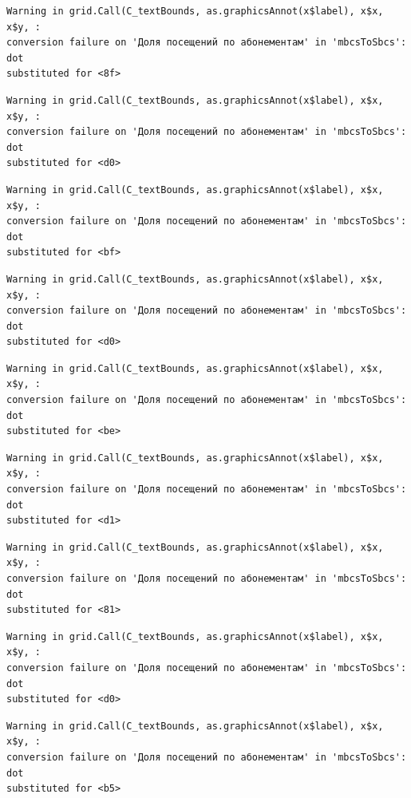 \documentclass[
  letterpaper,
  DIV=11,
  numbers=noendperiod]{scrartcl}
\begin{document}
\begin{verbatim}
Warning in grid.Call(C_textBounds, as.graphicsAnnot(x$label), x$x, x$y, :
conversion failure on 'Доля посещений по абонементам' in 'mbcsToSbcs': dot
substituted for <8f>
\end{verbatim}

\begin{verbatim}
Warning in grid.Call(C_textBounds, as.graphicsAnnot(x$label), x$x, x$y, :
conversion failure on 'Доля посещений по абонементам' in 'mbcsToSbcs': dot
substituted for <d0>
\end{verbatim}

\begin{verbatim}
Warning in grid.Call(C_textBounds, as.graphicsAnnot(x$label), x$x, x$y, :
conversion failure on 'Доля посещений по абонементам' in 'mbcsToSbcs': dot
substituted for <bf>
\end{verbatim}

\begin{verbatim}
Warning in grid.Call(C_textBounds, as.graphicsAnnot(x$label), x$x, x$y, :
conversion failure on 'Доля посещений по абонементам' in 'mbcsToSbcs': dot
substituted for <d0>
\end{verbatim}

\begin{verbatim}
Warning in grid.Call(C_textBounds, as.graphicsAnnot(x$label), x$x, x$y, :
conversion failure on 'Доля посещений по абонементам' in 'mbcsToSbcs': dot
substituted for <be>
\end{verbatim}

\begin{verbatim}
Warning in grid.Call(C_textBounds, as.graphicsAnnot(x$label), x$x, x$y, :
conversion failure on 'Доля посещений по абонементам' in 'mbcsToSbcs': dot
substituted for <d1>
\end{verbatim}

\begin{verbatim}
Warning in grid.Call(C_textBounds, as.graphicsAnnot(x$label), x$x, x$y, :
conversion failure on 'Доля посещений по абонементам' in 'mbcsToSbcs': dot
substituted for <81>
\end{verbatim}

\begin{verbatim}
Warning in grid.Call(C_textBounds, as.graphicsAnnot(x$label), x$x, x$y, :
conversion failure on 'Доля посещений по абонементам' in 'mbcsToSbcs': dot
substituted for <d0>
\end{verbatim}

\begin{verbatim}
Warning in grid.Call(C_textBounds, as.graphicsAnnot(x$label), x$x, x$y, :
conversion failure on 'Доля посещений по абонементам' in 'mbcsToSbcs': dot
substituted for <b5>
\end{verbatim}
\end{document}
